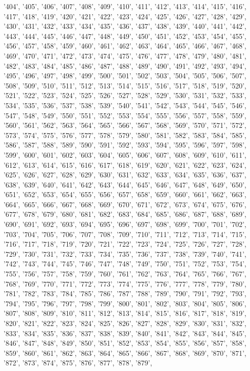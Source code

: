 '404', '405', '406', '407', '408', '409', '410', '411', '412', '413', '414', '415', '416', '417', '418', '419', '420', '421', '422', '423', '424', '425', '426', '427', '428', '429', '430', '431', '432', '433', '434', '435', '436', '437', '438', '439', '440', '441', '442', '443', '444', '445', '446', '447', '448', '449', '450', '451', '452', '453', '454', '455', '456', '457', '458', '459', '460', '461', '462', '463', '464', '465', '466', '467', '468', '469', '470', '471', '472', '473', '474', '475', '476', '477', '478', '479', '480', '481', '482', '483', '484', '485', '486', '487', '488', '489', '490', '491', '492', '493', '494', '495', '496', '497', '498', '499', '500', '501', '502', '503', '504', '505', '506', '507', '508', '509', '510', '511', '512', '513', '514', '515', '516', '517', '518', '519', '520', '521', '522', '523', '524', '525', '526', '527', '528', '529', '530', '531', '532', '533', '534', '535', '536', '537', '538', '539', '540', '541', '542', '543', '544', '545', '546', '547', '548', '549', '550', '551', '552', '553', '554', '555', '556', '557', '558', '559', '560', '561', '562', '563', '564', '565', '566', '567', '568', '569', '570', '571', '572', '573', '574', '575', '576', '577', '578', '579', '580', '581', '582', '583', '584', '585', '586', '587', '588', '589', '590', '591', '592', '593', '594', '595', '596', '597', '598', '599', '600', '601', '602', '603', '604', '605', '606', '607', '608', '609', '610', '611', '612', '613', '614', '615', '616', '617', '618', '619', '620', '621', '622', '623', '624', '625', '626', '627', '628', '629', '630', '631', '632', '633', '634', '635', '636', '637', '638', '639', '640', '641', '642', '643', '644', '645', '646', '647', '648', '649', '650', '651', '652', '653', '654', '655', '656', '657', '658', '659', '660', '661', '662', '663', '664', '665', '666', '667', '668', '669', '670', '671', '672', '673', '674', '675', '676', '677', '678', '679', '680', '681', '682', '683', '684', '685', '686', '687', '688', '689', '690', '691', '692', '693', '694', '695', '696', '697', '698', '699', '700', '701', '702', '703', '704', '705', '706', '707', '708', '709', '710', '711', '712', '713', '714', '715', '716', '717', '718', '719', '720', '721', '722', '723', '724', '725', '726', '727', '728', '729', '730', '731', '732', '733', '734', '735', '736', '737', '738', '739', '740', '741', '742', '743', '744', '745', '746', '747', '748', '749', '750', '751', '752', '753', '754', '755', '756', '757', '758', '759', '760', '761', '762', '763', '764', '765', '766', '767', '768', '769', '770', '771', '772', '773', '774', '775', '776', '777', '778', '779', '780', '781', '782', '783', '784', '785', '786', '787', '788', '789', '790', '791', '792', '793', '794', '795', '796', '797', '798', '799', '800', '801', '802', '803', '804', '805', '806', '807', '808', '809', '810', '811', '812', '813', '814', '815', '816', '817', '818', '819', '820', '821', '822', '823', '824', '825', '826', '827', '828', '829', '830', '831', '832', '833', '834', '835', '836', '837', '838', '839', '840', '841', '842', '843', '844', '845', '846', '847', '848', '849', '850', '851', '852', '853', '854', '855', '856', '857', '858', '859', '860', '861', '862', '863', '864', '865', '866', '867', '868', '869', '870', '871', '872', '873', '874', '875', '876', '877', '878', '879', 